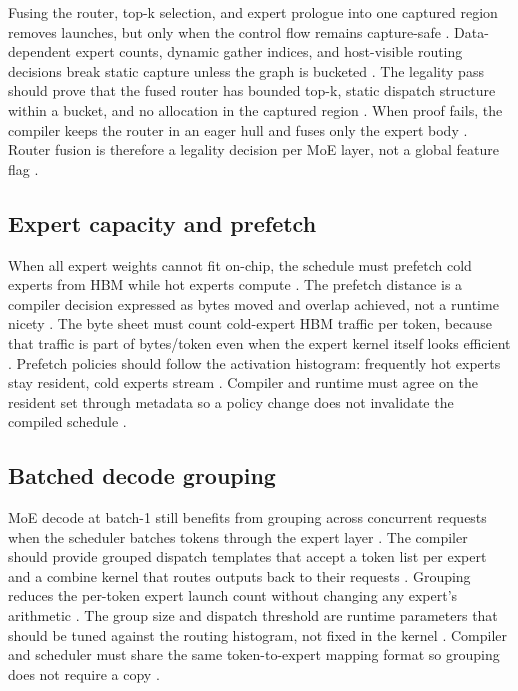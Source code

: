 Fusing the router, top-k selection, and expert prologue into one captured region removes launches, but only when the control flow remains capture-safe \citep{nvidia2024cudagraphs,liu2024deepseekv3,patel2025llminference}. Data-dependent expert counts, dynamic gather indices, and host-visible routing decisions break static capture unless the graph is bucketed \citep{kwon2023vllm,memoryfloor2026,chen2020compilerbasedhardw}. The legality pass should prove that the fused router has bounded top-k, static dispatch structure within a bucket, and no allocation in the captured region \citep{nvidia2024cudagraphs,yirage2026}. When proof fails, the compiler keeps the router in an eager hull and fuses only the expert body \citep{patel2025llminference,taxbreak2026}. Router fusion is therefore a legality decision per MoE layer, not a global feature flag \citep{chen2020compilerbasedhardw,memoryfloor2026}.

\subsection{Expert capacity and prefetch}

When all expert weights cannot fit on-chip, the schedule must prefetch cold experts from HBM while hot experts compute \citep{liu2024deepseekv3,semianalysis2024tma,memoryfloor2026}. The prefetch distance is a compiler decision expressed as bytes moved and overlap achieved, not a runtime nicety \citep{chen2020compilerbasedhardw,patel2025llminference}. The byte sheet must count cold-expert HBM traffic per token, because that traffic is part of bytes/token even when the expert kernel itself looks efficient \citep{memoryfloor2026,taxbreak2026}. Prefetch policies should follow the activation histogram: frequently hot experts stay resident, cold experts stream \citep{liu2024deepseekv3,patel2025llminference}. Compiler and runtime must agree on the resident set through metadata so a policy change does not invalidate the compiled schedule \citep{chen2020compilerbasedhardw,yirage2026}.

\subsection{Batched decode grouping}

MoE decode at batch-1 still benefits from grouping across concurrent requests when the scheduler batches tokens through the expert layer \citep{kwon2023vllm,liu2024deepseekv3,patel2025llminference}. The compiler should provide grouped dispatch templates that accept a token list per expert and a combine kernel that routes outputs back to their requests \citep{chen2020compilerbasedhardw,taxbreak2026}. Grouping reduces the per-token expert launch count without changing any expert's arithmetic \citep{liu2024deepseekv3,memoryfloor2026}. The group size and dispatch threshold are runtime parameters that should be tuned against the routing histogram, not fixed in the kernel \citep{patel2025llminference,memoryfloor2026}. Compiler and scheduler must share the same token-to-expert mapping format so grouping does not require a copy \citep{chen2020compilerbasedhardw,yirage2026}.

